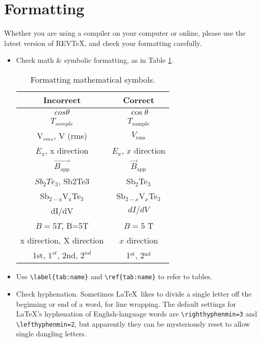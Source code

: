 \section{\label{sec:Formatting}Formatting}

 Whether you are using a compiler on your computer or online, please use the latest version of REVTeX, and check your formatting carefully.
\begin{itemize}[label=$\Box$]
\item Check math \& symbolic formatting, as in Table \ref{tab:mathformat}.
\begin{table}[h!]
  \begin{center}
    \caption{Formatting mathematical symbols.}
    \label{tab:mathformat}
    \begin{tabular}{c|c} %
      \hline
      \textbf{Incorrect} & \textbf{Correct} \\
      \hline \hline
      $cos \theta$ & $\cos \theta$ \\
      $T_{sample}$ & $T_\mathrm{sample}$ \\
      V$_{rms}$, V (rms) & $V_\mathrm{rms}$ \\
      $E_\mathrm{x}$, x direction & $E_x$, $x$ direction \\
      $\vec{B_\mathrm{app}}$ & $\vec{B}_\mathrm{app}$ \\
      $Sb_2Te_3$, Sb2Te3 & Sb$_2$Te$_3$ \\
      Sb$_{2-\mathrm{x}}$V$_\mathrm{x}$Te$_3$ & Sb$_{2-x}$V$_x$Te$_3$ \\
      dI/dV & $dI/dV$ \\
      $B = 5 T$, B=5T & $B=5$ T \\
      x direction, X direction & $x$ direction \\
      1st, $1^{st}$, 2nd, $2^{nd}$ & 1$^\mathrm{st}$, 2$^{\mathrm{nd}}$ \\
      \hline
    \end{tabular}
  \end{center}
\end{table}
\item Use {\tt \textbackslash label\{tab:name\}} and {\tt \textbackslash ref\{tab:name\}} to refer to tables.
\item Check hyphenation. Sometimes \LaTeX\ likes to divide a single letter off the beginning or end of a word, for line wrapping. The default settings for \LaTeX's hyphenation of English-language words are {\tt \textbackslash righthyphenmin=3} and {\tt \textbackslash lefthyphenmin=2}, but apparently they can be mysteriously reset to allow single dangling letters.

\end{itemize}
